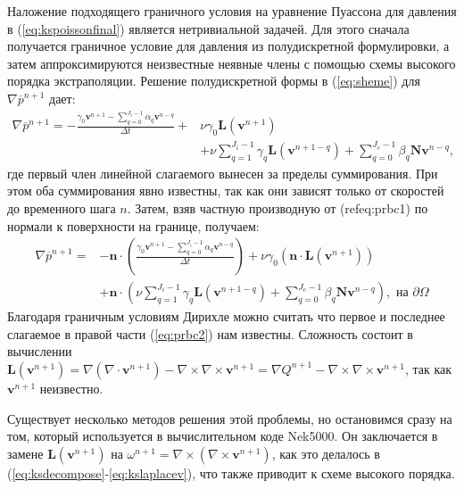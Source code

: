 Наложение подходящего граничного условия на уравнение Пуассона для давления в (\ref{eq:kspoissonfinal}) 
является нетривиальной задачей. 
%
Для этого сначала получается граничное условие для давления из полудискретной формулировки, 
а затем аппроксимируются неизвестные неявные члены с помощью схемы высокого порядка экстраполяции. 
%
Решение полудискретной формы в (\ref{eq:sheme}) для $\nabla \overline{p}^{n+1}$ дает:
%
\begin{equation}\label{eq:prbc1} 
\begin{split}
    \nabla \overline{p}^{n+1} = - \frac{\gamma_0 \textbf{v}^{n+1} - 
    \sum_{q=0}^{J_i-1} \alpha_q \textbf{v}^{n-q}}{\Delta t} 
    + & \nu \gamma_0 \textbf{L}(\textbf{v}^{n+1}) \\
    & + \nu \sum_{q=1}^{J_i-1} \gamma_q \textbf{L}(\textbf{v}^{n+1-q}) +
    \sum_{q=0}^{J_e-1} \beta_q \textbf{N}{\textbf{v}^{n-q}},
\end{split}
\end{equation}    
%
где первый член линейной слагаемого вынесен за пределы суммирования. 
%
При этом оба суммирования явно известны, так как они зависят только от скоростей до временного шага $n$. 
%
Затем, взяв частную производную от (ref{eq:prbc1}) по нормали к поверхности на границе, получаем:
%
%
\begin{equation}\label{eq:prbc2} 
\begin{split}
    \nabla \overline{p}^{n+1} = & -\textbf{n} \cdot (\frac{\gamma_0 \textbf{v}^{n+1} - \sum_{q=0}^{J_i-1} \alpha_q \textbf{v}^{n-q}}{\Delta t}) + \nu \gamma_0 (\textbf{n} \cdot \textbf{L}(\textbf{v}^{n+1})) \\ 
    & + \textbf{n} \cdot (\nu \sum_{q=1}^{J_i-1} \gamma_q \textbf{L}(\textbf{v}^{n+1-q}) +
    \sum_{q=0}^{J_e-1} \beta_q \textbf{N}{\textbf{v}^{n-q}}), \text{ на } \partial \Omega
\end{split}
\end{equation}    
%
Благодаря граничным условиям Дирихле можно считать что первое и последнее слагаемое в правой части
(\ref{eq:prbc2}) нам известны.
%
Сложность состоит в вычислении $\textbf{L}(\textbf{v}^{n+1}) = \nabla(\nabla \cdot
\textbf{v}^{n+1}) - \nabla \times {\nabla \times \textbf{v}^{n+1}} = \nabla Q^{n+1} -
\nabla \times {\nabla \times \textbf{v}^{n+1}}$, так как $\textbf{v}^{n+1}$ неизвестно.


%
Существует несколько методов решения этой проблемы, но остановимся сразу на том, который 
используется в вычислительном коде Nek5000.
%
Он заключается в замене $\textbf{L}(\textbf{v}^{n+1})$ на $\omega^{n+1} = \nabla \times
(\nabla \times \textbf{v}^{n+1})$, как это делалось в (\ref{eq:ksdecompose}-\ref{eq:kslaplacev}),
что также приводит к схеме высокого порядка.
%

